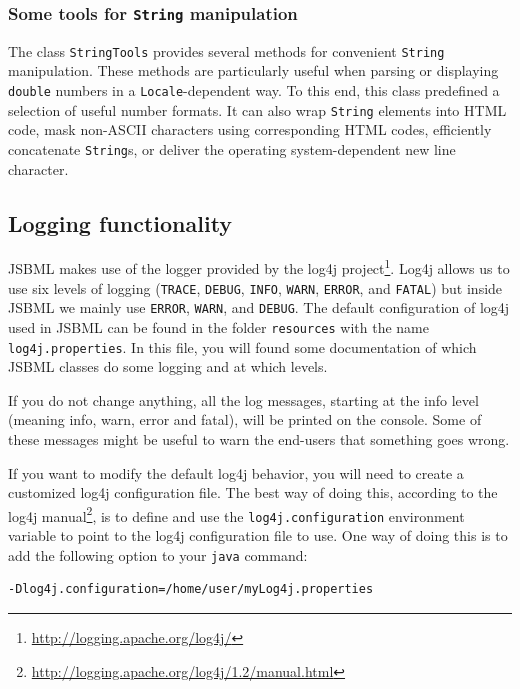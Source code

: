 \subsubsection{Some tools for \texttt{String} manipulation}

The class \texttt{StringTools}
%
provides several methods for convenient \texttt{String} manipulation. These
methods are particularly useful when parsing or displaying \texttt{double}
numbers in a \texttt{Locale}\hyp{}dependent way. To this end, this class
predefined a selection of useful number formats. It can also wrap
\texttt{String} elements into HTML code, mask non-ASCII characters using
corresponding HTML codes, efficiently concatenate \texttt{String}s, or deliver
the operating system\hyp{}dependent new line character.


\subsection{Logging functionality}
%

JSBML makes use of the logger provided by the log4j
project\footnote{\url{http://logging.apache.org/log4j/}}.
Log4j allows us to use six levels
of logging (\texttt{TRACE}, \texttt{DEBUG},
\texttt{INFO}, \texttt{WARN}, \texttt{ERROR}, and \texttt{FATAL}) but inside
JSBML we mainly use \texttt{ERROR}, \texttt{WARN}, and \texttt{DEBUG}. The
default configuration of log4j used in JSBML can be found in the folder
\texttt{resources} with the name \texttt{log4j.properties}.
In this file, you will found some documentation of which JSBML classes do some 
logging and at which levels. 
 
If you do not change anything, all the log messages, starting at the info level 
(meaning info, warn, error and fatal), will be printed on the console.
Some of these messages might be useful to warn the end-users that something
goes wrong.


If you want to modify the default log4j behavior, you will need to create a
customized log4j configuration file. The best way of doing this, according to
the log4j
manual\footnote{\url{http://logging.apache.org/log4j/1.2/manual.html}}, is to
define and use the \texttt{log4j.configuration} environment variable to point to
the log4j configuration file to use. One way of doing this is to add the
following option to your \texttt{java} command:
\begin{lstlisting}[language=bash,numbers=none,captionpos=t]
-Dlog4j.configuration=/home/user/myLog4j.properties
\end{lstlisting}

